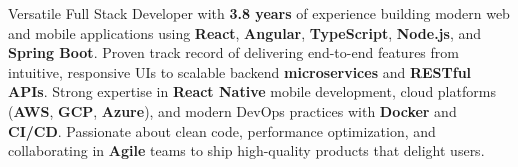 

\begin{cvparagraph}

Versatile Full Stack Developer with \textbf{3.8 years} of experience building modern web and mobile applications using \textbf{React}, \textbf{Angular}, \textbf{TypeScript}, \textbf{Node.js}, and \textbf{Spring Boot}. Proven track record of delivering end-to-end features from intuitive, responsive UIs to scalable backend \textbf{microservices} and \textbf{RESTful APIs}. Strong expertise in \textbf{React Native} mobile development, cloud platforms (\textbf{AWS}, \textbf{GCP}, \textbf{Azure}), and modern DevOps practices with \textbf{Docker} and \textbf{CI/CD}. Passionate about clean code, performance optimization, and collaborating in \textbf{Agile} teams to ship high-quality products that delight users.
\end{cvparagraph}
